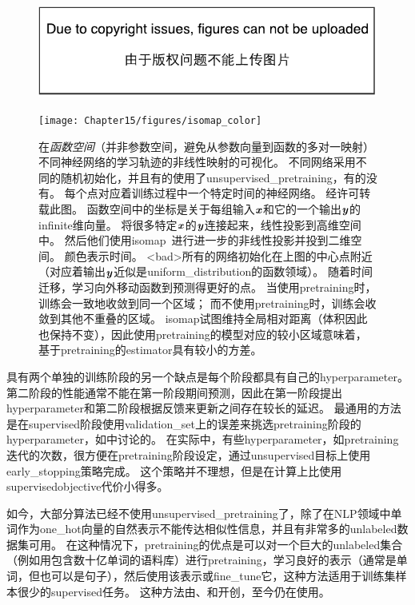 \begin{figure}[!htb]
\ifOpenSource
\centerline{\includegraphics{figure.pdf}}
\else
\centerline{\texttt{[image: Chapter15/figures/isomap\_color]}}
\fi
\caption{在\emph{函数空间}（并非参数空间，避免从参数向量到函数的多对一映射）不同神经网络的学习轨迹的非线性映射的可视化。
不同网络采用不同的随机初始化，并且有的使用了\gls{unsupervised_pretraining}，有的没有。
每个点对应着训练过程中一个特定时间的神经网络。
经\citet{Erhan+al-2010-small}许可转载此图。
函数空间中的坐标是关于每组输入$\boldsymbol{\mathit{x}}$和它的一个输出$\boldsymbol{\mathit{y}}$的\gls{infinite}维向量。
\cite{Erhan+al-2010-small}将很多特定$\boldsymbol{\mathit{x}}$的$\boldsymbol{\mathit{y}}$连接起来，线性投影到高维空间中。
然后他们使用\gls{isomap}~\citep{Tenenbaum2000-isomap}进行进一步的非线性投影并投到二维空间。
颜色表示时间。
<bad>所有的网络初始化在上图的中心点附近（对应着输出$\boldsymbol{\mathit{y}}$近似是\gls{uniform_distribution}的函数领域）。
随着时间迁移，学习向外移动函数到预测得更好的点。
当使用\gls{pretraining}时，训练会一致地收敛到同一个区域；
而不使用\gls{pretraining}时，训练会收敛到其他不重叠的区域。
\gls{isomap}试图维持全局相对距离（体积因此也保持不变），因此使用\gls{pretraining}的模型对应的较小区域意味着，基于\gls{pretraining}的\gls{estimator}具有较小的方差。
}
\label{fig:chap15_isomap}
\end{figure}


具有两个单独的训练阶段的另一个缺点是每个阶段都具有自己的\gls{hyperparameter}。
第二阶段的性能通常不能在第一阶段期间预测，因此在第一阶段提出\gls{hyperparameter}和第二阶段根据反馈来更新之间存在较长的延迟。
最通用的方法是在\gls{supervised}阶段使用\gls{validation_set}上的误差来挑选\gls{pretraining}阶段的\gls{hyperparameter}，如\cite{Larochelle-jmlr-2009}中讨论的。
在实际中，有些\gls{hyperparameter}，如\gls{pretraining}迭代的次数，很方便在\gls{pretraining}阶段设定，通过\gls{unsupervised}目标上使用\gls{early_stopping}策略完成。
这个策略并不理想，但是在计算上比使用\gls{supervised}\gls{objective}代价小得多。


如今，大部分算法已经不使用\gls{unsupervised_pretraining}了，除了在\gls{NLP}领域中单词作为\gls{one_hot}向量的自然表示不能传达相似性信息，并且有非常多的\gls{unlabeled}数据集可用。
在这种情况下，\gls{pretraining}的优点是可以对一个巨大的\gls{unlabeled}集合（例如用包含数十亿单词的语料库）进行\gls{pretraining}，学习良好的表示（通常是单词，但也可以是句子），然后使用该表示或\gls{fine_tune}它，这种方法适用于训练集样本很少的\gls{supervised}任务。
这种方法由\cite{CollobertR2008-small}、\cite{Turian+Ratinov+Bengio-2010-small}和\cite{collobert2011natural}开创，至今仍在使用。


